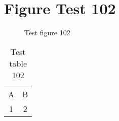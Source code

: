\documentclass{article}
\begin{document}
\section{Figure Test 102}
\begin{figure}[h]
\caption{Test figure 102}
\end{figure}
\begin{table}[h]
\caption{Test table 102}
\begin{tabular}{cc}
A & B \\
1 & 2
\end{tabular}
\end{table}
\end{document}
